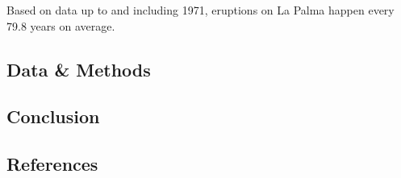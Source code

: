 \documentclass[
  letterpaper,
  DIV=11,
  numbers=noendperiod]{scrartcl}
\newlength{\cslhangindent}
\newenvironment{CSLReferences}[2] %
 {\begin{list}{}{%
  \setlength{\itemindent}{0pt}
  \setlength{\leftmargin}{0pt}
  \setlength{\parsep}{0pt}
  \ifodd #1
   \setlength{\leftmargin}{\cslhangindent}
   \setlength{\itemindent}{-1\cslhangindent}
  \fi
  \setlength{\itemsep}{#2\baselineskip}}}
 {\end{list}}
\begin{document}
Based on data up to and including 1971, eruptions on La Palma happen
every 79.8 years on average.

\subsection{Data \& Methods}\label{sec-data-methods}

\subsection{Conclusion}\label{conclusion-1}

\subsection*{References}\label{references}

\label{refs}
\begin{CSLReferences}{0}{1}
\end{CSLReferences}
\end{document}
